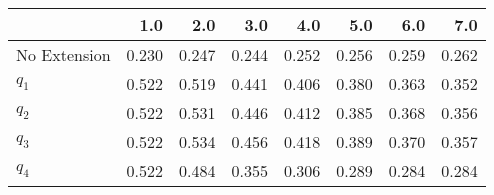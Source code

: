 \begin{tabular}{lrrrrrrr}
\toprule
{} &   1.0 &   2.0 &   3.0 &   4.0 &   5.0 &   6.0 &   7.0 \\
\midrule
No Extension & 0.230 & 0.247 & 0.244 & 0.252 & 0.256 & 0.259 & 0.262 \\
$q_1$        & 0.522 & 0.519 & 0.441 & 0.406 & 0.380 & 0.363 & 0.352 \\
$q_2$        & 0.522 & 0.531 & 0.446 & 0.412 & 0.385 & 0.368 & 0.356 \\
$q_3$        & 0.522 & 0.534 & 0.456 & 0.418 & 0.389 & 0.370 & 0.357 \\
$q_4$        & 0.522 & 0.484 & 0.355 & 0.306 & 0.289 & 0.284 & 0.284 \\
\bottomrule
\end{tabular}
